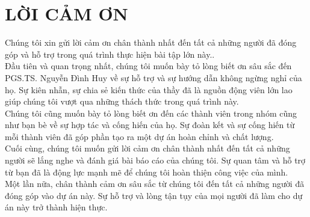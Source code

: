 \documentclass[12pt,a4paper]{report}
\begin{document}
    
    \section*{\centering LỜI CẢM ƠN}
        \hspace{0.5cm} Chúng tôi xin gửi lời cảm ơn chân thành nhất đến tất cả những người đã đóng góp và hỗ trợ trong quá trình thực hiện bài tập lớn này..\\

        Đầu tiên và quan trọng nhất, chúng tôi muốn bày tỏ lòng biết ơn sâu sắc đến PGS.TS. Nguyễn Đình Huy về sự hỗ trợ và sự hướng dẫn không ngừng nghỉ của họ. Sự kiên nhẫn, sự chia sẻ kiến thức của thầy đã là nguồn động viên lớn lao giúp chúng tôi vượt qua những thách thức trong quá trình này.\\

        Chúng tôi cũng muốn bày tỏ lòng biết ơn đến các thành viên trong nhóm cũng như bạn bè về sự hợp tác và cống hiến của họ. Sự đoàn kết và sự cống hiến từ mỗi thành viên đã góp phần tạo ra một dự án hoàn chỉnh và chất lượng.\\

        Cuối cùng, chúng tôi muốn gửi lời cảm ơn chân thành nhất đến tất cả những người sẽ lắng nghe và đánh giá bài báo cáo của chúng tôi. Sự quan tâm và hỗ trợ từ bạn đã là động lực mạnh mẽ để chúng tôi hoàn thiện công việc của mình.\\
        
        Một lần nữa, chân thành cảm ơn sâu sắc từ chúng tôi đến tất cả những người đã đóng góp vào dự án này. Sự hỗ trợ và lòng tận tụy của mọi người đã làm cho dự án này trở thành hiện thực.\\
    \tableofcontents
    \listoftables
    \listoffigures
    \newpage
    \normalsize
    
    
    
    
    
    
    \nocite{*}
    \printbibliography[title={TÀI LIỆU THAM KHẢO}, heading=bibintoc]
\end{document}
